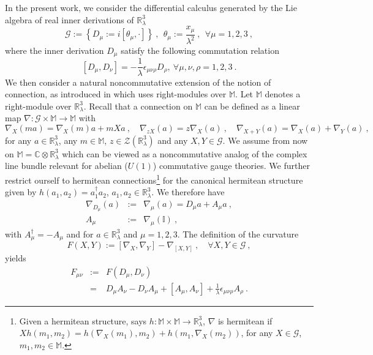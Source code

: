 \documentclass[11pt]{book}
\newcommand{\Gcal}{\mathcal{G}}
\newcommand{\Zcal}{\mathcal{Z}}
\newcommand{\Cbb}{\mathbb{C}}
\newcommand{\Ibb}{\mathbb{I}}
\newcommand{\Mbb}{\mathbb{M}}
\newcommand{\Rbb}{\mathbb{R}}
\theoremstyle{break}
\begin{document}
In the present work, we consider the differential calculus generated by the Lie algebra of real inner derivations of $\mathbb{R}^3_\lambda$%
%
\begin{equation*}
\mathcal{G} := \left\{D_\mu:= i \left[\theta_\mu, \cdot\right]\right\} \ ,  \ \ \theta_\mu := \frac{x_\mu}{\lambda^2} \ , \ \ \forall \mu = 1,2,3 \ , 
\end{equation*}
%
where the inner derivation $D_\mu$ satisfy the following commutation relation%
%
\begin{equation*}
\left[D_\mu,D_\nu\right] = -\frac{1}{\lambda} \epsilon_{\mu\nu\rho} D_\rho,\ \forall \mu,\nu,\rho = 1,2,3 \ . 
\end{equation*}
%
We then consider a natural noncommutative extension of the notion of connection, as introduced in \cite{dubois_violette_lectures_1999} which uses right-modules over $\Mbb$. Let $\Mbb$ denotes a right-module over $\Rbb^3_\lambda$. Recall that a connection on $\Mbb$ can be defined as a linear map $\nabla:\Gcal\times\Mbb\to\Mbb$ with
%
\begin{equation*}
\nabla_X(ma) = \nabla_X(m)a + mXa \ , \quad \nabla_{zX}(a)=z\nabla_X(a) \ , \quad \nabla_{X+Y}(a)=\nabla_X(a)+\nabla_Y(a) \ ,
\end{equation*}
%
for any $a\in\Rbb^3_\lambda$, any $m\in\Mbb$, $z\in \Zcal(\Rbb^3_\lambda)$ and any $X,Y\in\Gcal$. We assume from now on $\Mbb = \Cbb\otimes\mathbb{R}^3_\lambda$ which can be viewed as a noncommutative analog of the complex line bundle relevant for abelian ($U(1)$) commutative gauge theories. We further restrict ourself to hermitean connections\footnote{Given a hermitean structure, says $h:\Mbb\times\Mbb\to\Rbb^3_\lambda$, $\nabla$ is hermitean if $Xh(m_1,m_2)=h(\nabla_X(m_1),m_2)+h(m_1,\nabla_X(m_2))$, for any $X\in\Gcal$, $m_1,m_2\in\Mbb$.} for the canonical hermitean structure given by $h(a_1,a_2)=a_1^\dag a_2$, $a_1,a_2 \in \mathbb{R}^3_\lambda$. We therefore have 
%
\begin{eqnarray*}
\nabla_{D_\mu}(a) &:=& \nabla_\mu(a) = D_\mu a + A_\mu a \ , \\
A_\mu &:=& \nabla_\mu(\Ibb) \ , 
\end{eqnarray*}
%
with $A_\mu^\dag = - A_\mu$ and for $a\in\Rbb^3_\lambda$ and $\mu = 1,2,3$. The definition of the curvature 
%
\begin{equation*}
F(X,Y) := \left[\nabla_X,\nabla_Y\right] - \nabla_{\left[X,Y\right]} \ , \quad \forall X,Y \in \mathcal{G} \ , 
\end{equation*}
%
yields%
%
\begin{eqnarray}
F_{\mu\nu} &:=& F(D_\mu,D_\nu) \nonumber \\
&=& D_\mu A_\nu - D_\nu A_\mu + \left[A_\mu,A_\nu\right] + \frac{1}{\lambda} \epsilon_{\mu\nu\rho} A_\rho \ . 
\label{eq:curv_1}
\end{eqnarray}
\end{document}
